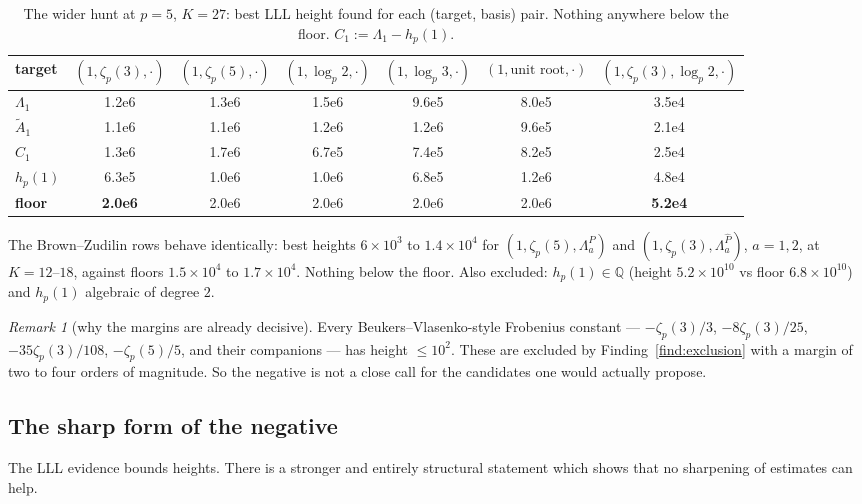 \documentclass[11pt,reqno]{article}
\newcommand{\QQ}{\mathbb{Q}}
\newcommand{\Ph}{\widehat{P}}
\newcommand{\Lah}{\Lambda^{\Ph}}
\newcommand{\Lap}{\Lambda^{P}}
\newcommand{\Atil}{\widetilde{A}}
\theoremstyle{plain}
\theoremstyle{definition}
\theoremstyle{remark}
\newtheorem{remark}[theorem]{Remark}
\numberwithin{equation}{section}
\begin{document}
\begin{table}[h]
\centering\small
\caption{The wider hunt at $p=5$, $K=27$: best LLL height found for each
(target, basis) pair.  Nothing anywhere below the floor.  $C_1:=\Lambda_1-h_p(1)$.}
\label{tab:lll2}
\begin{tabular}{@{}lcccccc@{}}
\toprule
target & $(1,\zeta_p(3),\cdot)$ & $(1,\zeta_p(5),\cdot)$ & $(1,\log_p2,\cdot)$
       & $(1,\log_p3,\cdot)$ & $(1,\text{unit root},\cdot)$
       & $(1,\zeta_p(3),\log_p2,\cdot)$\\
\midrule
$\Lambda_1$ & 1.2e6 & 1.3e6 & 1.5e6 & 9.6e5 & 8.0e5 & 3.5e4\\
$\Atil_1$ & 1.1e6 & 1.1e6 & 1.2e6 & 1.2e6 & 9.6e5 & 2.1e4\\
$C_1$ & 1.3e6 & 1.7e6 & 6.7e5 & 7.4e5 & 8.2e5 & 2.5e4\\
$h_p(1)$ & 6.3e5 & 1.0e6 & 1.0e6 & 6.8e5 & 1.2e6 & 4.8e4\\
\midrule
\textbf{floor} & \textbf{2.0e6} & 2.0e6 & 2.0e6 & 2.0e6 & 2.0e6 & \textbf{5.2e4}\\
\bottomrule
\end{tabular}
\end{table}

The Brown--Zudilin rows behave identically: best heights $6\times10^3$ to
$1.4\times10^4$ for $(1,\zeta_p(5),\Lap_a)$ and $(1,\zeta_p(3),\Lah_a)$,
$a=1,2$, at $K=12$--$18$, against floors $1.5\times10^4$ to $1.7\times10^4$.
Nothing below the floor.  Also excluded: $h_p(1)\in\QQ$ (height
$5.2\times10^{10}$ vs floor $6.8\times10^{10}$) and $h_p(1)$ algebraic of
degree $2$.

\begin{remark}[why the margins are already decisive]\label{rem:BVheights}
Every Beukers--Vlasenko-style Frobenius constant --- $-\zeta_p(3)/3$,
$-8\zeta_p(3)/25$, $-35\zeta_p(3)/108$, $-\zeta_p(5)/5$, and their companions
\cite{BV2025} --- has height $\le10^2$.  These are excluded by
Finding~\ref{find:exclusion} with a margin of two to four orders of magnitude.
So the negative is not a close call for the candidates one would actually
propose.
\end{remark}

\subsection{The sharp form of the negative}\label{ss:sharp}

The LLL evidence bounds heights.  There is a stronger and entirely structural
statement which shows that no sharpening of estimates can help.
\end{document}
